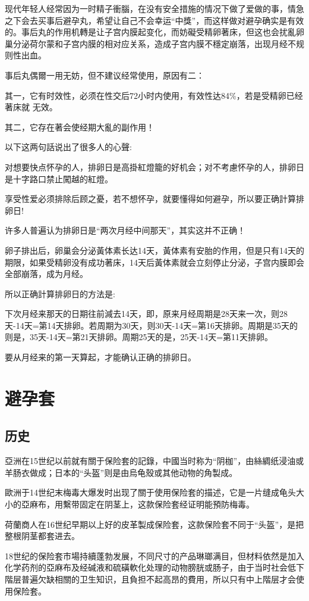 \documentclass[12pt,UTF8]{ctexbook}
\begin{document}
现代年轻人经常因为一时精子衝腦，在没有安全措施的情况下做了爱做的事，情急之下会去买事后避孕丸，希望让自己不会幸运“中獎”，而这样做对避孕确实是有效的。事后丸的作用机轉是让子宫内膜起变化，而妨礙受精卵著床，但这也会扰亂卵巢分泌荷尔蒙和子宫内膜的相对应关系，造成子宫内膜不穩定崩落，出现月经不规则性出血。

事后丸偶爾一用无妨，但不建议经常使用，原因有二：

其一，它有时效性，必须在性交后72小时内使用，有效性达84\%，若是受精卵已经著床就
无效。

其二，它存在著会使经期大亂的副作用！

以下这两句話说出了很多人的心聲:

对想要快点怀孕的人，排卵日是高掛紅燈籠的好机会；对不考慮怀孕的人，排卵日是十字路口禁止闖越的紅燈。

享受性爱必须排除后顾之憂，若不想怀孕，就要懂得如何避孕，所以要正确計算排卵日!

许多人普遍认为排卵日是“两次月经中间那天”，其实这并不正确！

卵子排出后，卵巢会分泌黃体素长达14天，黃体素有安胎的作用，但是只有14天的期限，如果受精卵没有成功著床，14天后黃体素就会立刻停止分泌，子宫内膜即会全部崩落，成为月经。

所以正确計算排卵日的方法是:

下次月经来那天的日期往前減去14天，即，原来月经周期是28天来一次，则28天-14天=第14天排卵。若周期为30天，则30天-14天=第16天排卵。周期是35天的则是，35天-14天=第21天排卵。周期25天的是，25天-14天=第11天排卵。

要从月经来的第一天算起，才能确认正确的排卵日。

\section{避孕套}

\subsection{历史}

亞洲在15世纪以前就有關于保险套的記錄，中國当时称为“阴枷”，由絲綢纸浸油或羊肠衣做成；日本的“头盔”则是由烏龟殼或其他动物的角製成。

歐洲于14世纪末梅毒大爆发时出现了關于使用保险套的描述，它是一片缝成龟头大小的亞麻布，用繫带固定在阴茎上，这款保险套经证明能預防梅毒。

荷蘭商人在16世纪早期以上好的皮革製成保险套，这款保险套不同于“头盔”，是把整根阴茎都套进去。

18世纪的保险套市場持續蓬勃发展，不同尺寸的产品琳瑯满目，但材料依然是加入化学药剂的亞麻布及经碱液和硫磺軟化处理的动物膀胱或肠子，由于当时社会低下階层普遍欠缺相關的卫生知识，且負担不起高昂的費用，所以只有中上階层才会使用保险套。
\end{document}
